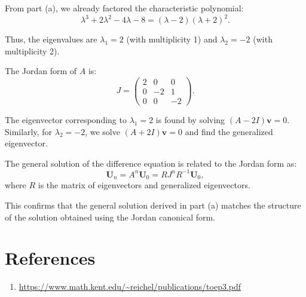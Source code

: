 \documentclass{article}
\renewcommand{\vec}[1]{\mathbf{#1}}
\begin{document}
\begin{enumerate}[(a)]
            From part (a), we already factored the characteristic polynomial:
            \[
            \lambda^3 + 2\lambda^2 - 4\lambda - 8 = (\lambda - 2)(\lambda + 2)^2.
            \]

            Thus, the eigenvalues are $\lambda_1 = 2$ (with multiplicity 1) and $\lambda_2 = -2$ (with multiplicity 2).

            The Jordan form of $A$ is:
            \[
            J = \begin{pmatrix}
            2 & 0 & 0 \\
            0 & -2 & 1 \\
            0 & 0 & -2
            \end{pmatrix}.
            \]

            The eigenvector corresponding to $\lambda_1 = 2$ is found by solving $(A - 2I)\vec{v} = 0$. Similarly, for $\lambda_2 = -2$, we solve $(A + 2I)\vec{v} = 0$ and find the generalized eigenvector.

            The general solution of the difference equation is related to the Jordan form as:
            \[
            \mathbf{U}_n = A^n \mathbf{U}_0 = RJ^n R^{-1} \mathbf{U}_0,
            \]
            where $R$ is the matrix of eigenvectors and generalized eigenvectors.

            This confirms that the general solution derived in part (a) matches the structure of the solution obtained using the Jordan canonical form.
\end{enumerate}





\newpage 
\section*{References}
\begin{enumerate}
    \item \url{https://www.math.kent.edu/~reichel/publications/toep3.pdf}
\end{enumerate}
\end{document}
